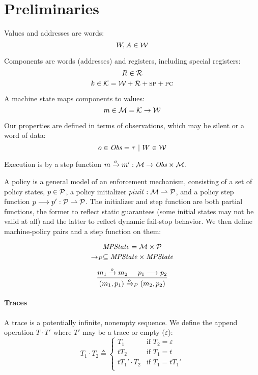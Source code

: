 \documentclass[conference]{IEEEtran}
\begin{document}
  \section{Preliminaries}

  
    Values and addresses are words:
    \[W,A \in {\mathcal W}\]
    
    Components are words (addresses) and registers, including special registers:
    \[R \in {\mathcal R}\]
    \[k \in {\mathcal K} = {\mathcal W} + {\mathcal R} + \textsc{sp} + \textsc{pc}\]

    A machine state maps components to values:
    \[m \in {\mathcal M} = {\mathcal K} \rightarrow {\mathcal W}\]

    Our properties are defined in terms of observations, which may be silent or a word of data:
    \[o \in \mathit{Obs} = \tau ~ | ~ W \in {\mathcal W}\]
    
    Execution is by a step function \(m \xrightarrow{o} m' : {\mathcal M} \rightarrow
    \mathit{Obs} \times {\mathcal M}\).

    A policy is a general model of an enforcement mechanism, consisting of
    a set of policy states, \(p \in \mathcal{P}\), a policy initializer
    \(pinit : {\mathcal M} \rightharpoonup \mathcal{P}\), and a policy step function \(p \longrightarrow p' :
    \mathcal{P} \rightharpoonup \mathcal{P}\). The initializer and step function are both partial functions,
    the former to reflect static guarantees (some initial states may not be valid at all) and
    the latter to reflect dynamic fail-stop behavior. We then define machine-policy pairs and
    a step function on them:

    \[\mathit{MPState} = {\mathcal M} \times \mathcal{P}\]
    \[\xrightarrow{}_P \subseteq \mathit{MPState} \times \mathit{MPState}\]

    \[\frac{m_1 \xrightarrow{o} m_2 \hspace{.5cm} p_1 \longrightarrow p_2}
           {(m_1,p_1) \xrightarrow{o}_P (m_2,p_2)}\]

  \paragraph{Traces}

    A trace is a potentially infinite, nonempty sequence. We define the append operation \(T \cdot T'\)
    where \(T'\) may be a trace or empty (\(\varepsilon\)):
    \[T_1 \cdot T_2 \triangleq
      \begin{cases}
        T_1 & \text{if } T_2 = \varepsilon \\
        t T_2 & \text{if } T_1 = t \\
        t T_1' \cdot T_2 & \text{if } T_1 = t T_1' \\
      \end{cases}\]
\end{document}
